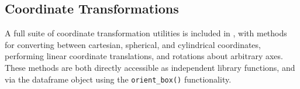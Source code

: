 \subsection{Coordinate Transformations}
\label{sec:coords}
A full suite of coordinate transformation utilities is included in , with methods for converting between cartesian, spherical, and cylindrical coordinates, performing linear coordinate translations, and rotations about arbitrary axes.  
These methods are both directly accessible as independent library functions, and via the  dataframe object using the \verb|orient_box()| functionality.